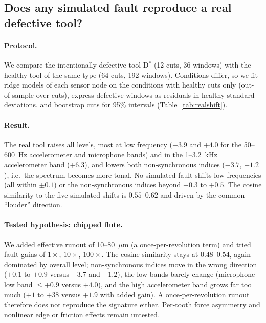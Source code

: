 \documentclass[11pt]{article}
\begin{document}
\subsection{Does any simulated fault reproduce a real defective tool?}\label{sec:real}
\paragraph{Protocol.} We compare the intentionally defective tool D$^*$ (12 cuts, 36 windows) with the healthy tool of the same type (64 cuts, 192 windows). Conditions differ, so we fit ridge models of each sensor node on the conditions with healthy cuts only (out-of-sample over cuts), express defective windows as residuals in healthy standard deviations, and bootstrap cuts for 95\% intervals (Table~\ref{tab:realshift}).
\begin{table}[t]\centering\footnotesize
\caption{Shift of each sensor node in healthy standard deviations: real defective tool D$^*$ (95\% bootstrap intervals over cuts) versus five simulated faults.}\label{tab:realshift}

\end{table}
\paragraph{Result.} The real tool raises all levels, most at low frequency ($+3.9$ and $+4.0$ for the 50--600~Hz accelerometer and microphone bands) and in the 1--3.2~kHz accelerometer band ($+6.3$), and lowers both non-synchronous indices ($-3.7$, $-1.2$), i.e.\ the spectrum becomes more tonal. No simulated fault shifts low frequencies (all within $\pm0.1$) or the non-synchronous indices beyond $-0.3$ to $+0.5$. The cosine similarity to the five simulated shifts is $0.55$--$0.62$ and driven by the common ``louder'' direction.
\paragraph{Tested hypothesis: chipped flute.} We added effective runout of 10--80~$\mu$m (a once-per-revolution term) and tried fault gains of $1\times$, $10\times$, $100\times$. The cosine similarity stays at $0.48$--$0.54$, again dominated by overall level; non-synchronous indices move in the wrong direction ($+0.1$ to $+0.9$ versus $-3.7$ and $-1.2$), the low bands barely change (microphone low band $\le+0.9$ versus $+4.0$), and the high accelerometer band grows far too much ($+1$ to $+38$ versus $+1.9$ with added gain). A once-per-revolution runout therefore does not reproduce the signature either. Per-tooth force asymmetry and nonlinear edge or friction effects remain untested.
\end{document}
